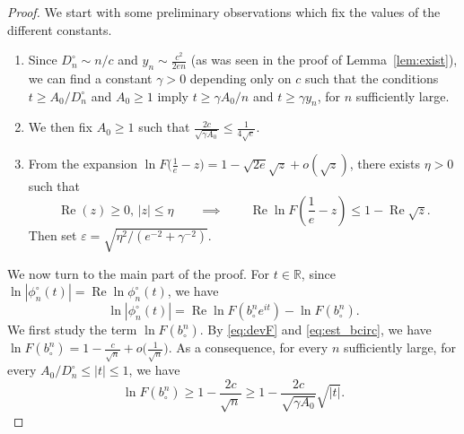 \documentclass[10pt]{amsart}
\theoremstyle{definition}\newtheorem{defi}[theo]{Definition}\newtheorem{rema}[theo]{Remark}\newtheorem{exam}[theo]{Example}\newtheorem{exem}[theo]{Example}\newtheorem{nota}[theo]{Notation}
\renewcommand{\Re}{\operatorname{Re}}
\newcommand{\R}{\mathbb{R}}
\def\bcn{b_{\circ}^{n}}
\def\phicn{\phi^{\circ}_{n}}
\def\Dcn{D^{\circ}_{n}}
\renewcommand{\epsilon}{\varepsilon}
\begin{document}
\begin{proof}We start with some preliminary observations which fix the values of the different constants.
\begin{enumerate}
\item[--]  Since $\Dcn \sim n /c$ and $y_{n} \sim \frac{c^{2}}{2en}$ (as was seen in the proof of Lemma~\ref{lem:exist}),
  we can find a constant $\gamma>0$ depending only on $c$ such that
  the conditions $t \ge  {A_0}/{\Dcn}$ and $A_{0} \geq 1$ imply
  $t \ge {\gamma A_0}/{n}$ and $t \ge \gamma y_{n}$,
  for $n$ sufficiently large.
\item[--] We then fix $A_{0} \geq 1$ such that $\frac{2c}{\sqrt{\gamma A_{0}}} \leq  \frac{1}{4\sqrt{e}}$.
\item[--] From the expansion $ \ln F \big( \tfrac{1}{e}-z \big)= 1-\sqrt{2e} \sqrt{z}+o(\sqrt{z})$, there exists $\eta>0$ such that
\begin{equation}
\label{eq:z} \Re(z) \ge 0, \, |z| \leq \eta  \qquad \implies  \qquad  \Re \ln F \left( \frac{1}{e}-z \right) \leq  1-  \Re \sqrt{z}.
\end{equation}
Then set $\epsilon= \sqrt{\eta^{2}/(e^{-2}+\gamma^{-2})}$.
\end{enumerate}


We now turn to the main part of the proof. For $t \in \R$, since
$ \ln |\phicn(t)| =\Re \ln \phicn(t)$, we have
\begin{equation}
\label{eq:lnphi} \ln |\phicn(t)| =\Re \ln F( \bcn e^{it})- \ln F( \bcn).
\end{equation}
We first study the term $\ln F( \bcn)$.
By \eqref{eq:devF} and \eqref{eq:est_bcirc}, we have $\ln F( \bcn)=1- \tfrac{c}{\sqrt{n}}+ o \big(  \frac{1}{\sqrt{n}} \big)$.  As a consequence, for every $n$ sufficiently large, for every $  {A_{0}}/{\Dcn} \leq |t| \leq 1$, we have
\begin{equation}
\label{eq:ln}\ln F( \bcn) \geq 1- \frac{2c}{\sqrt{n}} \geq 1- \frac{2c}{\sqrt{\gamma A_{0}}} \sqrt{|t|}.
\end{equation}


\end{proof}
\end{document}
